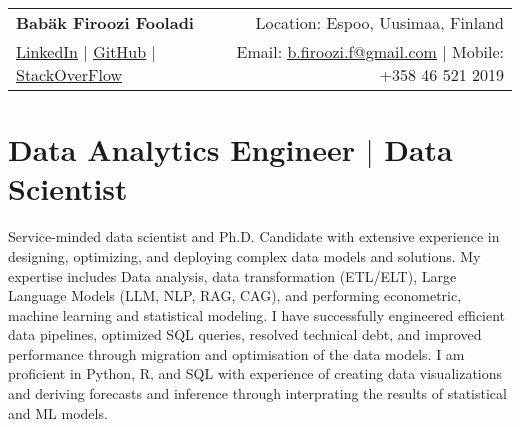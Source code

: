 \documentclass[a4paper,11pt]{article}
\begin{document}
	
	
	
	
	\begin{tabular*}{\textwidth}{l@{\extracolsep{\fill}}r}
		\textbf{\Huge Babäk Firoozi Fooladi \vspace{2pt}} & %
		Location: Espoo, Uusimaa, Finland \\ %
		\href{https://www.linkedin.com/in/babak-firoozi-fooladi/}{\uline{LinkedIn}} $|$ %
		\href{https://github.com/Babakfifoo}{\uline{GitHub}} $|$ %
		\href{https://stackoverflow.com/users/5116559/babak-fi-foo}{\uline{StackOverFlow}} & %
		Email: \href{mailto:b.firoozi.f@gmail.com}{\uline{b.firoozi.f@gmail.com}} $|$ %
		Mobile: +358 46 521 2019 \\ %
	\end{tabular*}
	
	
	
	\section{Data Analytics Engineer $|$ Data Scientist}
	\small{
		Service-minded data scientist and Ph.D. Candidate with extensive experience in designing, optimizing, and deploying complex data models and solutions. My expertise includes Data analysis, data transformation (ETL/ELT), Large Language Models (LLM, NLP, RAG, CAG), and performing econometric, machine learning and statistical modeling. I have successfully engineered efficient data pipelines, optimized SQL queries, resolved technical debt, and improved performance through migration and optimisation of the data models. I am proficient in Python, R, and SQL with experience of creating data visualizations and deriving forecasts and inference through interprating the results of statistical and ML models.
	}
	
\end{document}
